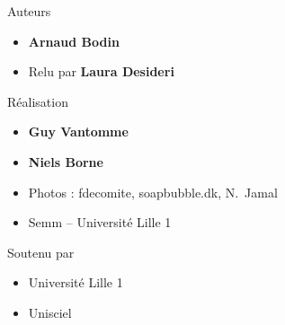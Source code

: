 \begin{frame}
\begin{minipage}{0.90\textwidth}
   
  Auteurs
  \begin{itemize}
  \item {\bf Arnaud Bodin}

  \item Relu par {\bf Laura Desideri}
 
  \end{itemize}

  \smallskip

  Réalisation
  \begin{itemize}
    \item {\bf Guy Vantomme}
    \item {\bf Niels Borne} 
    \item Photos : fdecomite, soapbubble.dk, N.~Jamal
    \item Semm -- Université Lille 1
  \end{itemize}

  \smallskip

  Soutenu par 
  \begin{itemize}
    \item Université Lille 1
    \item Unisciel
  \end{itemize}

  \end{minipage}  



\end{frame}


